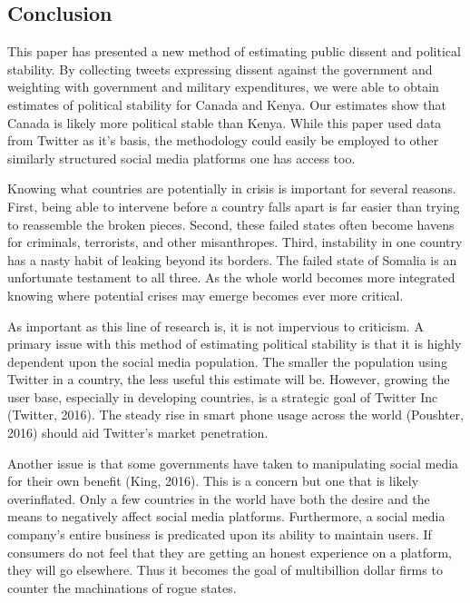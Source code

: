 \documentclass[12pt]{article}
\begin{document}
\begin{spacing}{1.5}
\section*{Conclusion}

This paper has presented a new method of estimating public dissent and political stability. By collecting tweets expressing dissent against the government and weighting with government and military expenditures, we were able to obtain estimates of political stability for Canada and Kenya. Our estimates show that Canada is likely more political stable than Kenya. While this paper used data from Twitter as it's basis, the methodology could easily be employed to other similarly structured social media platforms one has access too.    


Knowing what countries are potentially in crisis is important for several reasons. First, being able to intervene before a country falls apart is far easier than trying to reassemble the broken pieces. Second, these failed states often become havens for criminals, terrorists, and other misanthropes. Third, instability in one country has a nasty habit of leaking beyond its borders. The failed state of Somalia is an unfortunate testament to all three. As the whole world becomes more integrated knowing where potential crises may emerge becomes ever more critical. 


As important as this line of research is, it is not impervious to criticism. A primary issue with this method of estimating political stability is that it is highly dependent upon the social media population. The smaller the population using Twitter in a country, the less useful this estimate will be. However, growing the user base, especially in developing countries, is a strategic goal of Twitter Inc (Twitter, 2016). The steady rise in smart phone usage across the world (Poushter, 2016) should aid Twitter's market penetration. 

Another issue is that some governments have taken to manipulating social media for their own benefit (King, 2016). This is a concern but one that is likely overinflated. Only a few countries in the world have both the desire and the means to negatively affect social media platforms. Furthermore, a social media company's entire business is predicated upon its ability to maintain users. If consumers do not feel that they are getting an honest experience on a platform, they will go elsewhere. Thus it becomes the goal of multibillion dollar firms to counter the machinations of rogue states. 


\end{spacing}
\end{document}
